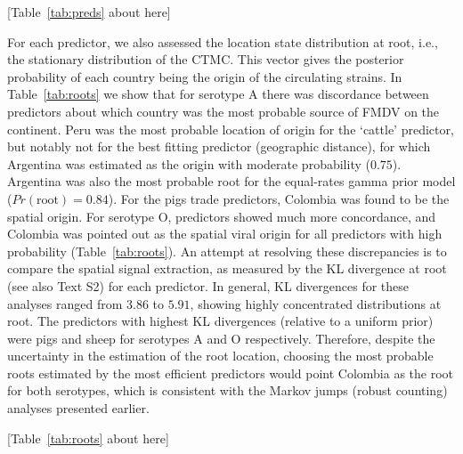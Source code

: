 \documentclass[10pt]{article}
\begin{document}
\begin{center}
 [Table~\ref{tab:preds} about here]
\end{center}

For each predictor, we also assessed the location state distribution at root, i.e., the stationary distribution of the CTMC. 
This vector gives the posterior probability of each country being the origin of the circulating strains.
In Table~\ref{tab:roots} we show that for serotype A there was discordance between predictors about which country was the most probable source of FMDV on the continent.
Peru was the most probable location of origin for the `cattle' predictor, but notably not for the best fitting predictor (geographic distance), for which Argentina was estimated as the origin with moderate probability ($0.75$).
Argentina was also the most probable root for the equal-rates gamma prior model ($Pr(\text{root})=0.84$).
For the pigs trade predictors, Colombia was found to be the spatial origin.
For serotype O, predictors showed much more concordance, and Colombia was pointed out as the spatial viral origin for all predictors with high probability (Table~\ref{tab:roots}).
An attempt at resolving these discrepancies is to compare the spatial signal extraction, as measured by the KL divergence at root~\cite{roots} (see also Text S2) for each predictor.
In general, KL divergences for these analyses ranged from $3.86$ to $5.91$, showing highly concentrated distributions at root. 
The predictors with highest KL divergences (relative  to a uniform prior) were pigs and sheep for serotypes A and O respectively.
Therefore, despite the uncertainty in the estimation of the root location, choosing the most probable roots estimated by the most efficient predictors would point Colombia as the root for both serotypes, which is consistent with the Markov jumps (robust counting) analyses presented earlier.

\begin{center}
 [Table~\ref{tab:roots} about here]
\end{center}
\end{document}
